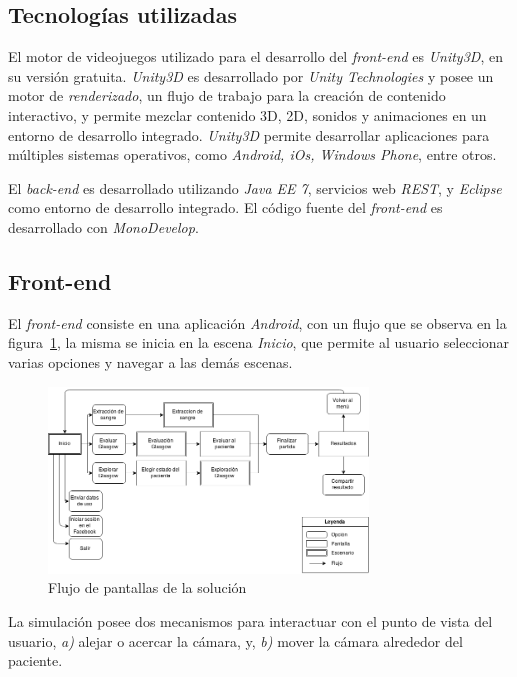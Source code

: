 \subsection{Tecnologías utilizadas}

El motor de videojuegos utilizado para el desarrollo del \textit{front-end} es
\textit{Unity3D}, en su versión gratuita. \textit{Unity3D} es desarrollado por
\textit{Unity Technologies} y posee un motor de \textit{renderizado}, un flujo
de trabajo para la creación de contenido interactivo, y permite mezclar
contenido 3D, 2D, sonidos y animaciones en un entorno de desarrollo integrado.
\textit{Unity3D} permite desarrollar aplicaciones para múltiples sistemas
operativos, como \textit{Android, iOs, Windows Phone}, entre
otros\cite{unity3d}.

El \textit{back-end} es desarrollado utilizando \textit{Java EE 7}, servicios web
\textit{REST}, y \textit{Eclipse} como entorno de desarrollo integrado. El
código fuente del \textit{front-end} es desarrollado con \textit{MonoDevelop}.

\subsection{Front-end}

El \textit{front-end} consiste en una aplicación \textit{Android}, con un flujo que se observa en la
figura~\ref{fig:flujo_frontend}, la misma se inicia en la escena \emph{Inicio},
que permite al usuario seleccionar varias opciones y navegar a las demás
escenas.

\begin{figure}
\centering
\includegraphics[width=8.5cm]{../solucion/images/grafo_escenas.png}
\caption{Flujo de pantallas de la solución}
\label{fig:flujo_frontend}
\end{figure}

La simulación posee dos mecanismos para interactuar con el punto de vista del
usuario, \textit{a)} alejar o acercar la cámara, y, \textit{b)} mover la cámara
alrededor del paciente.

